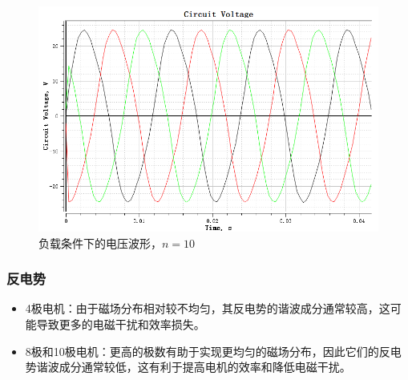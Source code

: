 \documentclass{thuemp}
\begin{document}
\begin{figure}[H]
  \centering
  \includegraphics[width=1\linewidth]{./img/task3/voltage-n10-load.png}
  \caption{负载条件下的电压波形，$n=10$}
\end{figure}

\subsubsection{反电势}
\begin{itemize}
	\item 4极电机：由于磁场分布相对较不均匀，其反电势的谐波成分通常较高，这可能导致更多的电磁干扰和效率损失。
	\item 8极和10极电机：更高的极数有助于实现更均匀的磁场分布，因此它们的反电势谐波成分通常较低，这有利于提高电机的效率和降低电磁干扰。
\end{itemize}
\end{document}
